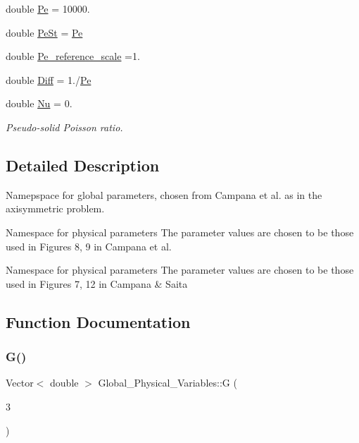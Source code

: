 \begin{DoxyCompactItemize}
double \hyperlink{namespaceGlobal__Physical__Variables_af252119266d6a28d2111d9d52bf59e87}{Pe} = 10000.
\item 
double \hyperlink{namespaceGlobal__Physical__Variables_a0d381c0d7044e78db412ca695e1edca0}{Pe\+St} = \hyperlink{namespaceGlobal__Physical__Variables_af252119266d6a28d2111d9d52bf59e87}{Pe}
\item 
double \hyperlink{namespaceGlobal__Physical__Variables_a66121b333d26605f8f30ad916d8082f0}{Pe\+\_\+reference\+\_\+scale} =1.
\item 
double \hyperlink{namespaceGlobal__Physical__Variables_a5fdab26ae05957e84318279a47f71bde}{Diff} = 1./\hyperlink{namespaceGlobal__Physical__Variables_af252119266d6a28d2111d9d52bf59e87}{Pe}
\item 
double \hyperlink{namespaceGlobal__Physical__Variables_a3962c36313826b19f216f6bbbdd6a477}{Nu} = 0.
\begin{DoxyCompactList}\small\item\em Pseudo-\/solid Poisson ratio. \end{DoxyCompactList}\end{DoxyCompactItemize}


\subsection{Detailed Description}
Namepspace for global parameters, chosen from Campana et al. as in the axisymmetric problem.

Namespace for physical parameters The parameter values are chosen to be those used in Figures 8, 9 in Campana et al.

Namespace for physical parameters The parameter values are chosen to be those used in Figures 7, 12 in Campana \& Saita 

\subsection{Function Documentation}
\mbox{\label{namespaceGlobal__Physical__Variables_af5ae275cf339105b9a54821c034df470}} 
\subsubsection{\texorpdfstring{G()}{G()}}
{\footnotesize\ttfamily Vector$<$ double $>$ Global\+\_\+\+Physical\+\_\+\+Variables\+::G (\begin{DoxyParamCaption}\item[{3}]{ }\end{DoxyParamCaption})}



